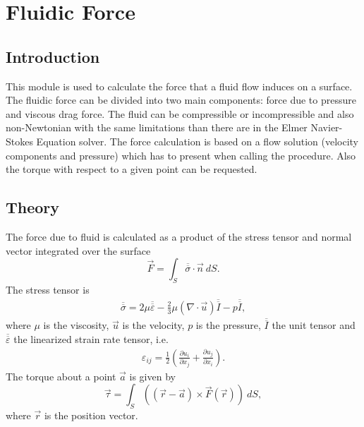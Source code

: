\chapter{Fluidic Force}

\begin{versiona}


\section{Introduction}

This module is used to calculate the force that a fluid flow induces
on a surface. The fluidic force can be divided into two main
components: force due to pressure and viscous drag force. The fluid
can be compressible or incompressible and also non-Newtonian with the
same limitations than there are in the Elmer Navier-Stokes Equation
solver. The force calculation is based on a flow solution (velocity
components and pressure) which has to present when calling the
procedure. Also the torque with respect to a given point can be
requested.


\section{Theory}

The force due to fluid is calculated as a product of the stress
tensor and normal vector integrated over the surface
\begin{equation}
\vec F = \int_S \overline{\overline\sigma}\cdot\vec n~dS.
\end{equation}
The stress tensor is
\begin{eqnarray}
\overline{\overline\sigma} = 2\mu \overline{\overline\varepsilon}
-\frac{2}{3} \mu (\nabla\cdot\vec u)\overline{\overline I} - p 
\overline{\overline I},
\end{eqnarray}
where $\mu$ is the viscosity, $\vec{u}$ is the velocity, $p$ is the
pressure, $\overline{\overline I}$ the unit tensor and
$\overline{\overline \varepsilon}$ the linearized strain rate tensor,
i.e.
\begin{eqnarray}
\varepsilon_{ij} = \frac{1}{2}\left( \frac{\partial u_i}{\partial x_j} +
\frac{\partial u_j}{\partial x_i}
\right).
\end{eqnarray}
The torque about a point $\vec a$ is given by 
\begin{equation}
\vec \tau = \int_S \left((\vec r-\vec a)\times\vec F(\vec r)\right)~dS,
\end{equation}
where $\vec r$ is the position vector.



\end{versiona}
